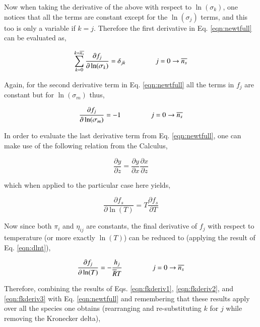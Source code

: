 	Now when taking the derivative of the above with respect to $\ln(\sigma_k)$, one notices that
all the terms are constant except for the $\ln(\sigma_j)$ terms, and this too is only a variable if
$k = j$.  Therefore the first derivative in Eq. \ref{eqn:newtfull} can be evaluated as,

\begin{equation}
	\sum_{k=0}^{k=\overline{n_s}}\frac{\partial f_j}{\partial \ln(\sigma_k)} = \delta_{jk}
	\hspace{15mm}j=0\rightarrow \overline{n_s}
\label{eqn:fkderiv1}
\end{equation}

	Again, for the second derivative term in Eq. \ref{eqn:newtfull} all the terms in $f_j$ are constant
but for $\ln(\sigma_m)$ thus,

\begin{equation}
	\frac{\partial f_j}{\partial \ln(\sigma_m)} = -1 \hspace{15mm}j=0\rightarrow \overline{n_s}
\label{eqn:fkderiv2}
\end{equation}

	In order to evaluate the last derivative term from Eq. \ref{eqn:newtfull}, one can 
make use of the following relation from the Calculus,

\begin{equation}
	\frac{\partial y}{\partial z} = \frac{\partial y}{\partial x} \frac{\partial x}{\partial z}
\label{eqn:calculus}
\end{equation}

	which when applied to the particular case here yields,

\begin{equation}
	\frac{\partial f_s}{\partial \ln(T)} = T\frac{\partial f_s}{\partial T} 
\label{eqn:dlnt}
\end{equation}

	Now since both $\pi_i$ and $\eta_{ij}$ are constants, the final derivative of $f_j$ with respect
to temperature (or more exactly $\ln(T)$) can be reduced to (applying the result of Eq. \ref{eqn:dlnt}),

\begin{equation}
	\frac{\partial f_j}{\partial \ln(T)} = - \frac{h_j}{\overline{R}T} 
	\hspace{15mm}j=0\rightarrow \overline{n_s}
\label{eqn:fkderiv3}
\end{equation}

	Therefore, combining the results of Eqs. \ref{eqn:fkderiv1}, \ref{eqn:fkderiv2},
and \ref{eqn:fkderiv3} with Eq. \ref{eqn:newtfull} and remembering that these results apply over all 
the species one obtains (rearranging and re-substituting $k$ for $j$ while removing the Kronecker 
delta),

